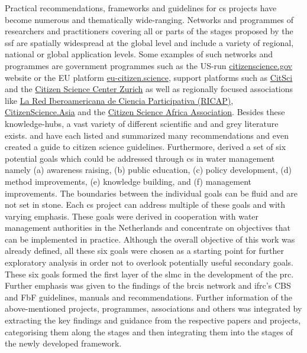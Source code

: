 Practical recommendations, frameworks and guidelines for \acrlong{cs} projects have become numerous and thematically wide-ranging. Networks and programmes of researchers and practitioners covering all or parts of the stages proposed by the \acrshort{ssf} are spatially widespread at the global level and include a variety of regional, national or global application levels. Some examples of such networks and programmes are government programmes such as the US-run \href{https://www.citizenscience.gov/}{citizenscience.gov} website or the EU platform \href{https://eu-citizen.science/}{eu-citizen.science}, support platforms such as \href{https://citsci.org/}{CitSci} and the \href{https://citizenscience.ch/en/}{Citizen Science Center Zurich} as well as regionally focused associations like \href{http://cienciaparticipativa.net/la-ricap/}{La Red Iberoamericana de Ciencia Participativa (RICAP)}, \href{https://citizenscience.asia/}{CitizenScience.Asia} and the \href{https://www.usiu.ac.ke/citsci-africa-association/}{Citizen Science Africa Association}.\newline
Besides these knowledge-hubs, a vast variety of different scientific and and grey literature exists. \autocite{fraislCitizenScienceEnvironmental2022} and \autocite{westonCommunityBasedWaterMonitoring2015} have each listed and summarized many recommendations and \autocite{garciaFindingWhatYou2021} even created a guide to citizen science guidelines. Furthermore, \autocite{minkmanCitizenScienceWater2015} derived a set of six potential goals which could be addressed through \acrlong{cs} in water management namely (a) awareness raising, (b) public education, (c) policy development, (d) method improvements, (e) knowledge building, and (f) management improvements. The boundaries between the individual goals can be fluid and are not set in stone. Each \acrshort{cs} project can address multiple of these goals and with varying emphasis. These goals were derived in cooperation with water management authorities in the Netherlands and concentrate on objectives that can be implemented in practice.\newline
Although the overall objective of this work was already defined, all these six goals were chosen as a starting point for further exploratory analysis in order not to overlook potentially useful secondary goals. These six goals formed the first layer of the \acrshort{slmc} in the development of the \acrshort{prc}. Further emphasis was given to the findings of the \acrshort{brcis} network and \acrshort{ifrc}'s CBS and FbF guidelines, manuals and recommendations. Further information of the above-mentioned projects, programmes, associations and others was integrated by extracting the key findings and guidance from the respective papers and projects, categorising them along the stages and then integrating them into the stages of the newly developed framework. 

